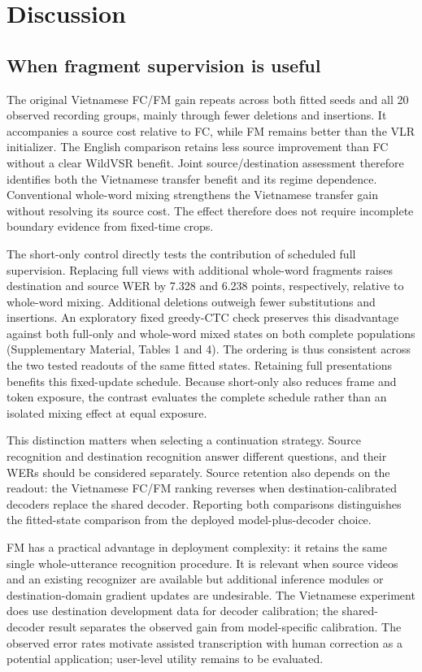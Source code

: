 \section{Discussion}
\subsection{When fragment supervision is useful}
The original Vietnamese FC/FM gain repeats across both fitted seeds and all
20 observed recording groups, mainly through fewer deletions and insertions.
It accompanies a source cost relative to FC, while FM remains better than the
VLR initializer. The English comparison retains less source improvement than FC
without a clear WildVSR benefit. Joint source/destination assessment therefore
identifies both the Vietnamese transfer benefit and its regime dependence.
Conventional whole-word mixing strengthens the Vietnamese transfer gain without
resolving its source cost. The effect therefore does not require incomplete
boundary evidence from fixed-time crops.

The short-only control directly tests the contribution of scheduled full
supervision. Replacing full views with additional whole-word fragments raises
destination and source WER by 7.328 and 6.238 points, respectively, relative to
whole-word mixing. Additional deletions outweigh fewer substitutions and
insertions. An exploratory fixed greedy-CTC check preserves this disadvantage
against both full-only and whole-word mixed states on both complete populations
(Supplementary Material, Tables 1 and 4). The ordering is thus consistent across
the two tested readouts of the same fitted states. Retaining full presentations
benefits this fixed-update schedule. Because short-only also reduces frame and
token exposure, the contrast evaluates the complete schedule rather than an
isolated mixing effect at equal exposure.

This distinction matters when selecting a continuation strategy. Source
recognition and destination recognition answer different questions, and their
WERs should be considered separately. Source retention also depends on the
readout: the Vietnamese FC/FM ranking reverses
when destination-calibrated decoders replace the shared decoder. Reporting both
comparisons distinguishes the fitted-state comparison from the deployed
model-plus-decoder choice.

FM has a practical advantage in deployment complexity: it retains the same
single whole-utterance recognition procedure. It is relevant when source videos
and an existing recognizer are available but additional inference modules or
destination-domain gradient updates are undesirable. The Vietnamese experiment
does use destination development data for decoder calibration; the shared-decoder
result separates the observed gain from model-specific calibration. The observed
error rates motivate assisted transcription with human correction as a potential
application; user-level utility remains to be evaluated.

